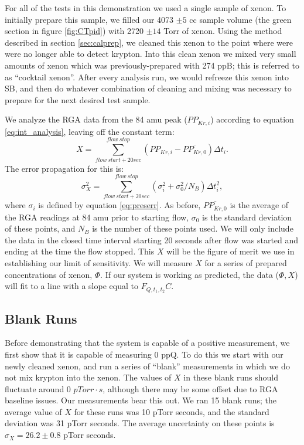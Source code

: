 For all of the tests in this demonstration we used a single sample of xenon. To initially prepare this sample, we filled our 4073 $\pm 5$ cc sample volume (the green section in figure \ref{fig:CTpid}) with 2720 $\pm 14$ Torr of xenon. Using the method described in section \ref{sec:calprep}, we cleaned this xenon to the point where were were no longer able to detect krypton. Into this clean xenon we mixed very small amounts of xenon which was previously-prepared with 274 ppB; this is referred to as ``cocktail xenon''. After every analysis run, we would refreeze this xenon into SB, and then do whatever combination of cleaning and mixing was necessary to prepare for the next desired test sample.

We analyze the RGA data from the 84 amu peak ($PP_{Kr,i}$) according to equation \ref{eq:int_analysis}, leaving off the constant term:
\begin{equation}
\label{eq:SLACintan}
X=\sum_{flow \  start+20sec}^{flow \ stop}(PP_{Kr,i}-\overline{PP_{Kr,0}})\Delta t_i.
\end{equation}
The error propagation for this is:
\begin{equation}
\sigma_{X}^2=\sum_{flow \  start+20sec}^{flow \ stop}(\sigma_i^2+\sigma_0^2/N_B)\Delta t_i^2,
\end{equation}
where $\sigma_i$ is defined by equation \ref{eq:preserr}. As before, $\overline{PP_{Kr,0}}$ is the average of the RGA readings at 84 amu prior to starting flow, $\sigma_0$ is the standard deviation of these points, and $N_B$ is the number of these points used. We will only include the data in the closed time interval starting 20 seconds after flow was started and ending at the time the flow stopped. This $X$ will be the figure of merit we use in establishing our limit of sensitivity. We will measure $X$ for a series of prepared concentrations of xenon, $\Phi$. If our system is working as predicted, the data ($\Phi,X$) will fit to a line with a slope equal to $F_{Q,t_1,t_2}C$.

\subsection{Blank Runs}\label{sec:blankruns}
Before demonstrating that the system is capable of a positive measurement, we first show that it is capable of measuring 0 ppQ. To do this we start with our newly cleaned xenon, and run a series of ``blank'' measurements in which we do not mix krypton into the xenon. The values of $X$ in these blank runs should fluctuate around 0 $pTorr\cdot s$, although there may be some offset due to RGA baseline issues. Our measurements bear this out. We ran 15 blank runs; the average value of $X$ for these runs was 10 pTorr seconds, and the standard deviation was 31 pTorr seconds. The average uncertainty on these points is $\sigma_X=26.2\pm0.8$ pTorr seconds.

